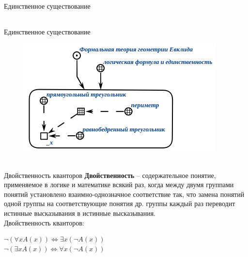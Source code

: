 \begin{frame}{\\Единственное существование}
	\topline
	\justifying
	\begin{SCn}
	\end{SCn}
\end{frame}

\begin{frame}{\\Единственное существование}
	\topline
	\justifying
	\vspace{10mm}
	\begin{figure}[H]
		\includegraphics[scale=1.0]{./figures/sd_logic/unique_existance.png}
	\end{figure}	
\end{frame}

\begin{frame}{\\Двойственность кванторов}
	\topline
	\justifying
	\textbf{Двойственность} -- содержательное понятие, применяемое в логике и математике всякий раз, когда между двумя группами понятий установлено взаимно-однозначное соответствие так, что замена понятий одной группы на соответствующие понятия др. группы каждый раз переводит истинные высказывания в истинные высказывания.\\
	Двойственность кванторов:
	\begin{center}
		$\neg(\forall xA(x)) \iff \exists x(\neg A(x))$\\
		$\neg(\exists xA(x)) \iff \forall x(\neg A(x))$
	\end{center}
\end{frame}

